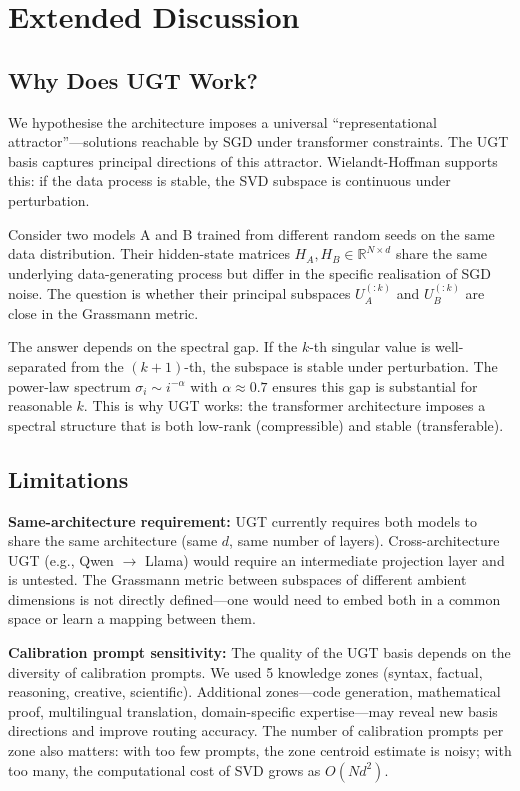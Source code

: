 \documentclass[11pt,a4paper]{article}
\begin{document}
\newpage

\section{Extended Discussion}

\subsection{Why Does UGT Work?}
We hypothesise the architecture imposes a universal ``representational attractor''---solutions reachable by SGD under transformer constraints. The UGT basis captures principal directions of this attractor. Wielandt-Hoffman supports this: if the data process is stable, the SVD subspace is continuous under perturbation.

Consider two models A and B trained from different random seeds on the same data distribution. Their hidden-state matrices $H_A, H_B \in \mathbb{R}^{N \times d}$ share the same underlying data-generating process but differ in the specific realisation of SGD noise. The question is whether their principal subspaces $U_A^{(:k)}$ and $U_B^{(:k)}$ are close in the Grassmann metric.

The answer depends on the spectral gap. If the $k$-th singular value is well-separated from the $(k+1)$-th, the subspace is stable under perturbation. The power-law spectrum $\sigma_i \sim i^{-\alpha}$ with $\alpha \approx 0.7$ ensures this gap is substantial for reasonable $k$. This is why UGT works: the transformer architecture imposes a spectral structure that is both low-rank (compressible) and stable (transferable).

\subsection{Limitations}

\textbf{Same-architecture requirement:} UGT currently requires both models to share the same architecture (same $d$, same number of layers). Cross-architecture UGT (e.g., Qwen $\rightarrow$ Llama) would require an intermediate projection layer and is untested. The Grassmann metric between subspaces of different ambient dimensions is not directly defined---one would need to embed both in a common space or learn a mapping between them.

\textbf{Calibration prompt sensitivity:} The quality of the UGT basis depends on the diversity of calibration prompts. We used 5 knowledge zones (syntax, factual, reasoning, creative, scientific). Additional zones---code generation, mathematical proof, multilingual translation, domain-specific expertise---may reveal new basis directions and improve routing accuracy. The number of calibration prompts per zone also matters: with too few prompts, the zone centroid estimate is noisy; with too many, the computational cost of SVD grows as $O(N d^2)$.
\end{document}
